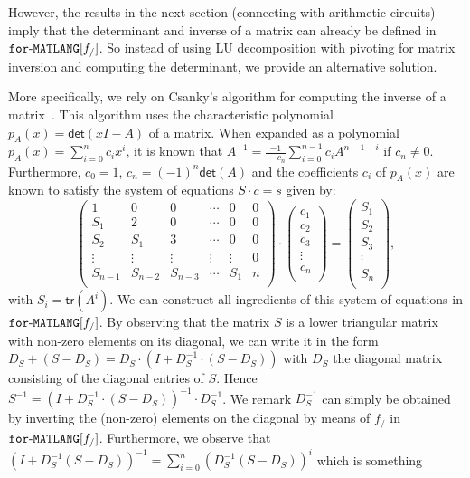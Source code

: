 However, the results
in the next section (connecting \langfor with arithmetic circuits) imply that the determinant
and inverse of a matrix can already be defined in $\texttt{for}\text{-}\texttt{MATLANG}[f_/]$. So instead of using LU decomposition with pivoting for matrix inversion and computing the determinant, we provide an alternative solution.

More specifically, we rely on Csanky's algorithm for computing the inverse of a matrix~\cite{Csanky76}. This algorithm uses the characteristic
polynomial $p_A(x)=\mathsf{det}(xI-A)$ of a matrix. When expanded as a polynomial
$p_A(x)=\sum_{i=0}^{n} c_i x^i$, it is known that $A^{-1}=\frac{-1}{\phantom{-1}c_n}\sum_{i=0}^{n-1}c_i A^{n-1-i}$
if $c_n\neq 0$. Furthermore, $c_0=1$, $c_n=(-1)^n\mathsf{det}(A)$ and the coefficients $c_i$ of $p_A(x)$
are known to satisfy the system of equations $S\cdot c=s$ given by:
$$
\left(\begin{matrix}
1 & 0 & 0 & \cdots & 0 & 0\\
S_1 & 2 & 0 & \cdots  &0 & 0\\
S_2 & S_1 & 3 & \cdots  &0 & 0\\
\vdots & \vdots & \vdots & \vdots & \vdots & 0\\
S_{n-1} & S_{n-2} & S_{n-3} & \cdots & S_1 & n\\
\end{matrix}\right)\cdot
\left(\begin{matrix}
c_1\\
c_2\\
c_3\\
\vdots\\
c_n\\
\end{matrix}\right)=\left(\begin{matrix}
S_1\\
S_2\\
S_3\\
\vdots\\
S_n\\
\end{matrix}\right),
$$
with $S_i=\mathsf{tr}(A^i)$. We can construct all ingredients of this system of equations in $\texttt{for}\text{-}\texttt{MATLANG}[f_/]$. By observing that the matrix $S$ is a lower triangular matrix with non-zero elements on its diagonal, we can write it in the form $D_S+(S-D_{S})=D_S\cdot(I+D_S^{-1}\cdot (S-D_S))$ with $D_S$ the diagonal matrix consisting of the diagonal entries of $S$.
Hence $S^{-1}=(I+D_{S}^{-1}\cdot(S-D_{S}))^{-1}\cdot D_S^{-1}$. 
We remark $D_S^{-1}$ can simply be obtained by inverting the (non-zero) elements on the diagonal by means of $f_/$ in $\texttt{for}\text{-}\texttt{MATLANG}[f_/]$. Furthermore, we observe that $(I+D_S^{-1}(S-D_S))^{-1}=\sum_{i=0}^{n}(D_S^{-1}(S-D_S))^i$ which is something

